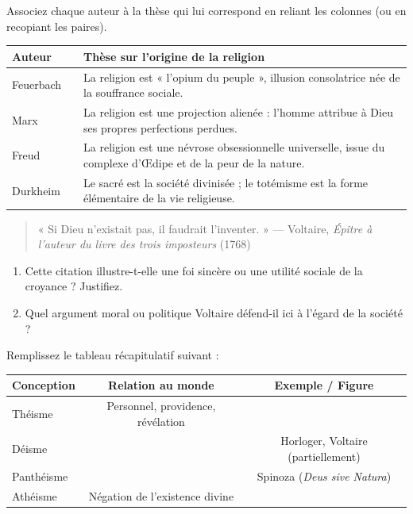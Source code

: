 \documentclass[11pt]{article}
\begin{document}
\begin{exercice}
Associez chaque auteur à la thèse qui lui correspond en reliant les colonnes (ou en recopiant les paires).
\begin{center}
\begin{tabular}{|p{3.5cm}|p{3.5cm}|p{3.5cm}|}
\hline
\textbf{Auteur} & & \textbf{Thèse sur l'origine de la religion} \\
\hline
Feuerbach & \dotfill & La religion est « l'opium du peuple », illusion consolatrice née de la souffrance sociale. \\
\hline
Marx & \dotfill & La religion est une projection alienée : l'homme attribue à Dieu ses propres perfections perdues. \\
\hline
Freud & \dotfill & La religion est une névrose obsessionnelle universelle, issue du complexe d'Œdipe et de la peur de la nature. \\
\hline
Durkheim & \dotfill & Le sacré est la société divinisée ; le totémisme est la forme élémentaire de la vie religieuse. \\
\hline
\end{tabular}
\end{center}
\end{exercice}

\begin{exercice}
\begin{quote}
« Si Dieu n'existait pas, il faudrait l'inventer. » \hfill — Voltaire, \textit{Épître à l'auteur du livre des trois imposteurs} (1768)
\end{quote}
\begin{enumerate}
    \item Cette citation illustre-t-elle une foi sincère ou une utilité sociale de la croyance ? Justifiez.
    \item Quel argument moral ou politique Voltaire défend-il ici à l'égard de la société ?
\end{enumerate}
\end{exercice}

\begin{exercice}
Remplissez le tableau récapitulatif suivant :
\begin{center}
\begin{tabular}{|l|c|c|}
\hline
\textbf{Conception} & \textbf{Relation au monde} & \textbf{Exemple / Figure} \\
\hline
Théisme & Personnel, providence, révélation & \dotfill \\
\hline
Déisme & \dotfill & Horloger, Voltaire (partiellement) \\
\hline
Panthéisme & \dotfill & Spinoza (\textit{Deus sive Natura}) \\
\hline
Athéisme & Négation de l'existence divine & \dotfill \\
\hline
\end{tabular}
\end{center}
\end{exercice}
\end{document}
